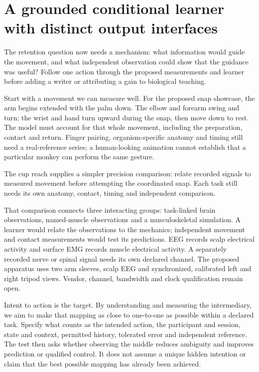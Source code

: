 \section{A grounded conditional learner with distinct output interfaces}
The retention question now needs a mechanism: what information would guide
the movement, and what independent observation could show that the guidance
was useful? Follow one action through the proposed measurements and learner
before adding a writer or attributing a gain to biological teaching.

Start with a movement we can measure well. For the proposed snap showcase,
the arm begins extended with the palm down. The elbow and forearm swing and
turn; the wrist and hand turn upward during the snap, then move down to rest.
The model must account for that whole movement, including the preparation,
contact and return. Finger pairing, organism-specific anatomy and timing still
need a real-reference series; a human-looking animation cannot establish that
a particular monkey can perform the same gesture.

The cup reach supplies a simpler precision comparison: relate recorded signals
to measured movement before attempting the coordinated snap. Each task still
needs its own anatomy, contact, timing and independent comparison.

That comparison connects three interacting groups: task-linked brain
observations, named-muscle observations and a musculoskeletal simulation.
A learner would relate the observations to the mechanics; independent movement
and contact measurements would test its predictions. EEG records scalp
electrical activity and surface EMG records muscle electrical activity.
A separately recorded nerve or spinal signal needs its own declared channel.
The proposed apparatus uses two arm sleeves, scalp EEG and synchronized,
calibrated left and right tripod views. Vendor, channel, bandwidth and clock
qualification remain open.

Intent to action is the target. By understanding and measuring the intermediary,
we aim to make that mapping as close to one-to-one as possible within a declared
task. Specify what counts as the intended action, the participant and session,
state and context, permitted history, tolerated error and independent reference.
The test then asks whether observing the middle reduces ambiguity and improves
prediction or qualified control. It does not assume a unique hidden intention
or claim that the best possible mapping has already been achieved.

